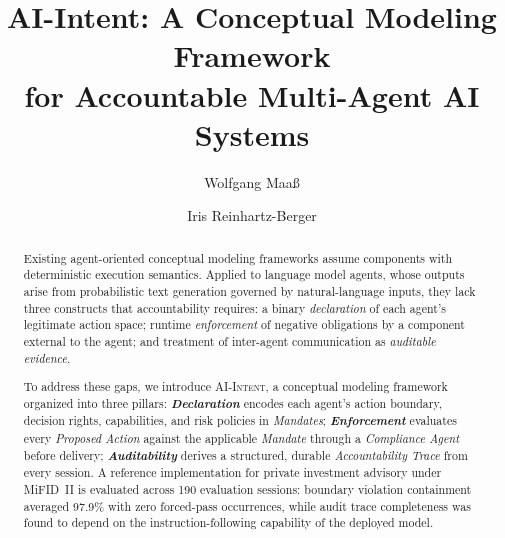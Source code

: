 \documentclass[runningheads]{llncs}
\begin{document}
\title{AI-Intent: A Conceptual Modeling Framework\\
for Accountable Multi-Agent AI Systems}


\author{Wolfgang Maa\ss{} \and Iris Reinhartz-Berger}

\maketitle

\begin{abstract}
Existing agent-oriented conceptual modeling frameworks assume components with deterministic execution semantics. Applied to language model agents, whose outputs arise from probabilistic text generation governed by natural-language inputs, they lack three constructs that accountability requires: a binary \emph{declaration} of each agent's legitimate action space; runtime \emph{enforcement} of negative obligations by a component external to the agent; and treatment of inter-agent communication as \emph{auditable evidence}.

To address these gaps, we introduce \textsc{AI-Intent},
a conceptual modeling framework organized into three pillars:
\textbf{\textit{Declaration}} encodes each agent's action boundary, decision rights, capabilities, and risk policies in \textit{Mandates}; \textbf{\textit{Enforcement}} evaluates every \textit{Proposed Action} against the applicable \textit{Mandate} through a \textit{Compliance Agent} before delivery; \textbf{\textit{Auditability}} derives a structured, durable \textit{Accountability Trace} from every session.
A reference implementation for private investment advisory under MiFID~II is evaluated across 190 evaluation sessions: boundary violation containment averaged 97.9\% with zero forced-pass occurrences, while audit trace completeness was found to depend on the instruction-following capability of the deployed model.

\end{abstract}
\end{document}
